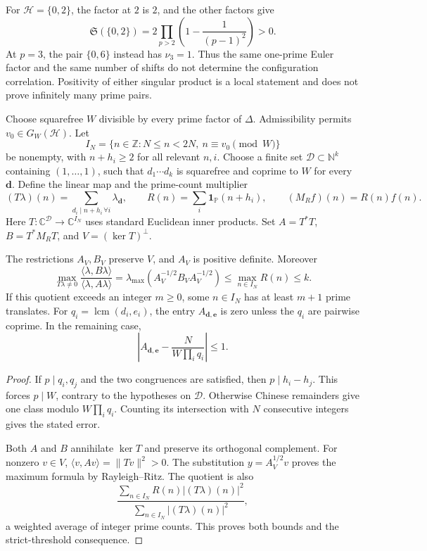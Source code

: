 For $\mathcal H=\{0,2\}$, the factor at $2$ is $2$, and the other factors give
\[
 \mathfrak S(\{0,2\})=2\prod_{p>2}\left(1-\frac1{(p-1)^2}\right)>0.
\]
At $p=3$, the pair $\{0,6\}$ instead has $\nu_3=1$.
Thus the same one-prime Euler factor and the same number of shifts do not determine
the configuration correlation.
Positivity of either singular product is a local statement and does not prove
infinitely many prime pairs.

Choose squarefree $W$ divisible by every prime factor of $\Delta$.
Admissibility permits $v_0\in G_W(\mathcal H)$.
Let
\[
 I_N=\{n\in\mathbb Z:N\leq n<2N,\ n\equiv v_0\pmod W\}
\]
be nonempty, with $n+h_i\geq2$ for all relevant $n,i$.
Choose a finite set $\mathcal D\subset\mathbb N^k$ containing $(1,\ldots,1)$,
such that $d_1\cdots d_k$ is squarefree and coprime to $W$ for every $\boldsymbol d$.
Define the linear map and the prime-count multiplier
\[
 (T\lambda)(n)=\sum_{d_i\mid n+h_i\,\forall i}\lambda_{\boldsymbol d},\qquad
 R(n)=\sum_i\mathbf1_{\mathbb P}(n+h_i),\qquad
 (M_Rf)(n)=R(n)f(n).
\]
Here $T:\mathbb C^{\mathcal D}\to\mathbb C^{I_N}$ uses standard Euclidean inner products.
Set $A=T^*T$, $B=T^*M_RT$, and $V=(\ker T)^\perp$.

\begin{proposition}
\label{syn-arith:finite-rayleigh}
The restrictions $A_V,B_V$ preserve $V$, and $A_V$ is positive definite.
Moreover
\begin{equation}
 \max_{T\lambda\ne0}\frac{\langle\lambda,B\lambda\rangle}
                           {\langle\lambda,A\lambda\rangle}
 =\lambda_{\max}(A_V^{-1/2}B_VA_V^{-1/2})
 \leq\max_{n\in I_N}R(n)\leq k.
 \label{syn-arith:rayleigh}
\end{equation}
If this quotient exceeds an integer $m\geq0$, some $n\in I_N$ has at least
$m+1$ prime translates.
For $q_i=\operatorname{lcm}(d_i,e_i)$, the entry $A_{\boldsymbol d,\boldsymbol e}$
is zero unless the $q_i$ are pairwise coprime.
In the remaining case,
\[
 \left|A_{\boldsymbol d,\boldsymbol e}-\frac{N}{W\prod_iq_i}\right|\leq1.
\]
\end{proposition}
\begin{proof}
If $p\mid q_i,q_j$ and the two congruences are satisfied, then $p\mid h_i-h_j$.
This forces $p\mid W$, contrary to the hypotheses on $\mathcal D$.
Otherwise Chinese remainders give one class modulo $W\prod_iq_i$.
Counting its intersection with $N$ consecutive integers gives the stated error.

Both $A$ and $B$ annihilate $\ker T$ and preserve its orthogonal complement.
For nonzero $v\in V$, $\langle v,Av\rangle=\|Tv\|^2>0$.
The substitution $y=A_V^{1/2}v$ proves the maximum formula by Rayleigh--Ritz.
The quotient is also
\[
 \frac{\sum_{n\in I_N}R(n)|(T\lambda)(n)|^2}
      {\sum_{n\in I_N}|(T\lambda)(n)|^2},
\]
a weighted average of integer prime counts.
This proves both bounds and the strict-threshold consequence.
\end{proof}

